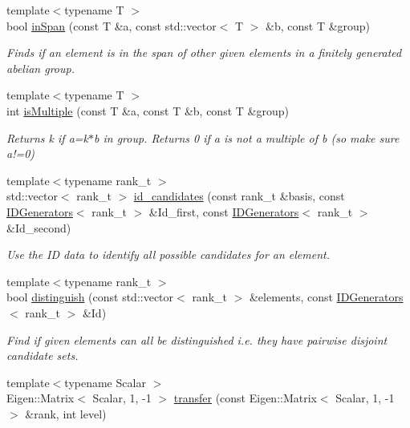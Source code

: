 \begin{DoxyCompactItemize}
{\footnotesize template$<$typename T $>$ }\\bool \hyperlink{namespaceMackey_a1ff253bf7e043ad6455b5fea23a83f09}{in\+Span} (const T \&a, const std\+::vector$<$ T $>$ \&b, const T \&group)
\begin{DoxyCompactList}\small\item\em Finds if an element is in the span of other given elements in a finitely generated abelian group. \end{DoxyCompactList}\item 
{\footnotesize template$<$typename T $>$ }\\int \hyperlink{namespaceMackey_af70b0c547f7121b8815885dfebde67d9}{is\+Multiple} (const T \&a, const T \&b, const T \&group)
\begin{DoxyCompactList}\small\item\em Returns k if a=k$\ast$b in group. Returns 0 if a is not a multiple of b (so make sure a!=0) \end{DoxyCompactList}\item 
{\footnotesize template$<$typename rank\+\_\+t $>$ }\\std\+::vector$<$ rank\+\_\+t $>$ \hyperlink{namespaceMackey_a83ac78e6d1695af40d0fa58af5255e84}{id\+\_\+candidates} (const rank\+\_\+t \&basis, const \hyperlink{classMackey_1_1IDGenerators}{I\+D\+Generators}$<$ rank\+\_\+t $>$ \&Id\+\_\+first, const \hyperlink{classMackey_1_1IDGenerators}{I\+D\+Generators}$<$ rank\+\_\+t $>$ \&Id\+\_\+second)
\begin{DoxyCompactList}\small\item\em Use the ID data to identify all possible candidates for an element. \end{DoxyCompactList}\item 
{\footnotesize template$<$typename rank\+\_\+t $>$ }\\bool \hyperlink{namespaceMackey_a281b9be315d7d51c7e691d4c733ac0c9}{distinguish} (const std\+::vector$<$ rank\+\_\+t $>$ \&elements, const \hyperlink{classMackey_1_1IDGenerators}{I\+D\+Generators}$<$ rank\+\_\+t $>$ \&Id)
\begin{DoxyCompactList}\small\item\em Find if given elements can all be distinguished i.\+e. they have pairwise disjoint candidate sets. \end{DoxyCompactList}\item 
{\footnotesize template$<$typename Scalar $>$ }\\Eigen\+::\+Matrix$<$ Scalar, 1, -\/1 $>$ \hyperlink{namespaceMackey_a671613d53fc3b0c9c4b115bc8b2797e6}{transfer} (const Eigen\+::\+Matrix$<$ Scalar, 1, -\/1 $>$ \&rank, int level)

\end{DoxyCompactItemize}
